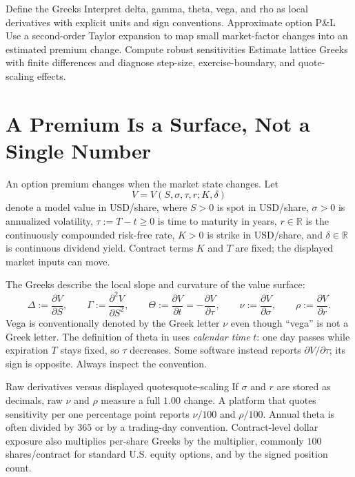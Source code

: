 \documentclass[11pt]{article}
\newcommand{\R}{\mathbb{R}}
\begin{document}

\learningobjectives
  {Define the Greeks}
  {Interpret delta, gamma, theta, vega, and rho as local derivatives with explicit units and sign conventions.}
  {Approximate option P\&L}
  {Use a second-order Taylor expansion to map small market-factor changes into an estimated premium change.}
  {Compute robust sensitivities}
  {Estimate lattice Greeks with finite differences and diagnose step-size, exercise-boundary, and quote-scaling effects.}

\section{A Premium Is a Surface, Not a Single Number}

An option premium changes when the market state changes. Let
\begin{equation}
  \label{eq:value-function}
  V=V(S,\sigma,\tau,r;K,\delta)
\end{equation}
denote a model value in USD/share, where $S>0$ is spot in USD/share, $\sigma>0$ is annualized volatility, $\tau:=T-t\geq 0$ is time to maturity in years, $r\in\R$ is the continuously compounded risk-free rate, $K>0$ is strike in USD/share, and $\delta\in\R$ is continuous dividend yield. Contract terms $K$ and $T$ are fixed; the displayed market inputs can move.

The Greeks describe the local slope and curvature of the value surface:
\begin{equation}
  \label{eq:greek-definitions}
  \Delta:=\frac{\partial V}{\partial S},
  \qquad
  \Gamma:=\frac{\partial^2V}{\partial S^2},
  \qquad
  \Theta:=\frac{\partial V}{\partial t}=-\frac{\partial V}{\partial\tau},
  \qquad
  \nu:=\frac{\partial V}{\partial\sigma},
  \qquad
  \rho:=\frac{\partial V}{\partial r}.
\end{equation}
Vega is conventionally denoted by the Greek letter $\nu$ even though ``vega'' is not a Greek letter. The definition of theta in  uses \emph{calendar time} $t$: one day passes while expiration $T$ stays fixed, so $\tau$ decreases. Some software instead reports $\partial V/\partial\tau$; its sign is opposite. Always inspect the convention.

\begin{remark}{Raw derivatives versus displayed quotes}{quote-scaling}
If $\sigma$ and $r$ are stored as decimals, raw $\nu$ and $\rho$ measure a full $1.00$ change. A platform that quotes sensitivity per one percentage point reports $\nu/100$ and $\rho/100$. Annual theta is often divided by $365$ or by a trading-day convention. Contract-level dollar exposure also multiplies per-share Greeks by the multiplier, commonly $100$ shares/contract for standard U.S. equity options, and by the signed position count.
\end{remark}
\end{document}

